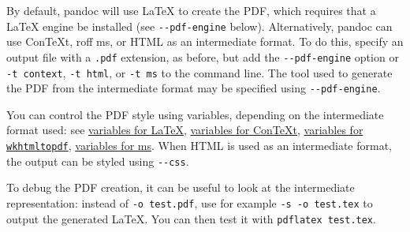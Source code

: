 By default, pandoc will use LaTeX to create the PDF, which requires that
a LaTeX engine be installed (see \texttt{-\/-pdf-engine} below).
Alternatively, pandoc can use ConTeXt, roff ms, or HTML as an
intermediate format. To do this, specify an output file with a
\texttt{.pdf} extension, as before, but add the \texttt{-\/-pdf-engine}
option or \texttt{-t\ context}, \texttt{-t\ html}, or \texttt{-t\ ms} to
the command line. The tool used to generate the PDF from the
intermediate format may be specified using \texttt{-\/-pdf-engine}.

You can control the PDF style using variables, depending on the
intermediate format used: see
\protect\hyperlink{variables-for-latex}{variables for LaTeX},
\protect\hyperlink{variables-for-context}{variables for ConTeXt},
\protect\hyperlink{variables-for-wkhtmltopdf}{variables for
\texttt{wkhtmltopdf}}, \protect\hyperlink{variables-for-ms}{variables
for ms}. When HTML is used as an intermediate format, the output can be
styled using \texttt{-\/-css}.

To debug the PDF creation, it can be useful to look at the intermediate
representation: instead of \texttt{-o\ test.pdf}, use for example
\texttt{-s\ -o\ test.tex} to output the generated LaTeX. You can then
test it with \texttt{pdflatex\ test.tex}.

